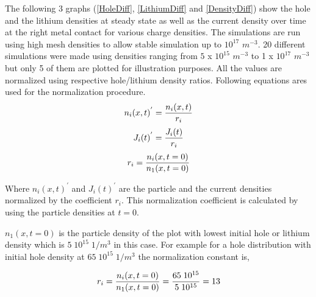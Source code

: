 \begin{doublespace}
 The following 3 graphs (\ref{HoleDiff}, \ref{LithiumDiff} and \ref{DensityDiff}) show the hole and the lithium densities at steady state as well as the current density over time at the right metal contact for various charge densities. The simulations are run using high mesh densities to allow stable simulation up to $10^{17}$ $m^{-3}$. 20 different simulations were made using densities ranging from $5$ x $10^{15}$  $m^{-3}$ to 1 x $10^{17}$  $m^{-3}$ but only 5 of them are plotted for illustration purposes. All the values are normalized using respective hole/lithium density ratios. Following equations ares used for the normalization procedure.
\begin{equation}
\centering
n_{i}(x,t)^{'}= \frac{n_{i}(x,t)}{r_i} 
\end{equation}
\begin{equation}
\centering
J_{i}(t)^{'}= \frac{J_i(t)}{r_i} 
\end{equation}
\begin{equation}
\centering
r_i = \frac{n_{i}(x,t=0)}{n_{1}(x,t=0)}
\label{NormConst}
\end{equation}

Where $n_{i}(x,t)^{'}$ and $J_{i}(t)^{'}$ are the particle and the current densities normalized by the coefficient $r_{i}$. This normalization coefficient is calculated by using the particle densities at $t=0$. 

$n_{1}(x,t=0)$ is the particle density of the plot with lowest initial hole or lithium density which is $5\;10^{15}\;1/m^3$ in this case. For example for a hole distribution with initial hole density at $65\;10^{15}\;1/m^3$ the normalization constant is,

\begin{equation}
\centering
r_i = \frac{n_{i}(x,t=0)}{n_{1}(x,t=0)} = \frac{65\;10^{15} }{5\;10^{15}} = 13
\label{NormConstVal}
\end{equation}


\end{doublespace}
